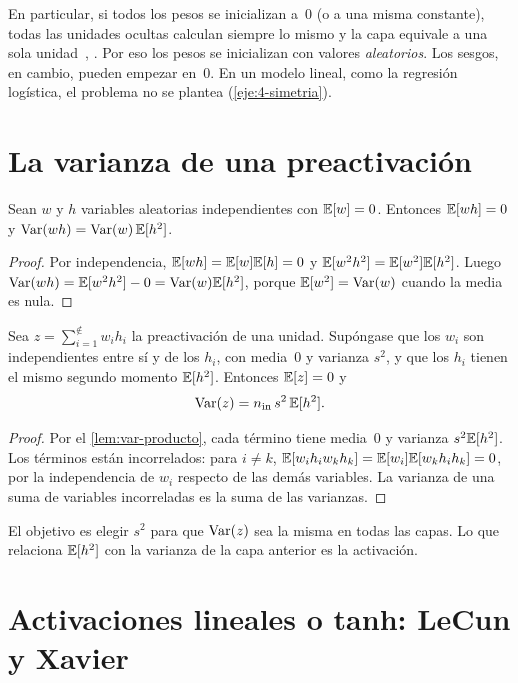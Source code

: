En particular, si todos los pesos se inicializan a~0 (o a una misma constante), todas las unidades ocultas calculan siempre lo mismo y la capa equivale a una sola unidad~\cite{cs231n}, \cite[§5.4.1.3]{d2l}. Por eso los pesos se inicializan con valores \emph{aleatorios}. Los sesgos, en cambio, pueden empezar en~0. En un modelo lineal, como la regresión logística, el problema no se plantea (\cref{eje:4-simetria}).

\section{La varianza de una preactivación}

\begin{lema}\label{lem:var-producto}
Sean $w$ y $h$ variables aleatorias independientes con $\mathbb{E}[w]=0$. Entonces $\mathbb{E}[wh]=0$ y $\operatorname{Var}(wh)=\operatorname{Var}(w)\,\mathbb{E}[h^{2}]$.
\end{lema}

\begin{proof}
Por independencia, $\mathbb{E}[wh]=\mathbb{E}[w]\mathbb{E}[h]=0$ y $\mathbb{E}[w^{2}h^{2}]=\mathbb{E}[w^{2}]\mathbb{E}[h^{2}]$. Luego $\operatorname{Var}(wh)=\mathbb{E}[w^{2}h^{2}]-0=\operatorname{Var}(w)\mathbb{E}[h^{2}]$, porque $\mathbb{E}[w^{2}]=\operatorname{Var}(w)$ cuando la media es nula.
\end{proof}

\begin{proposicion}\label{prop:var-adelante}
Sea $z=\sum_{i=1}^{\nin}w_ih_i$ la preactivación de una unidad. Supóngase que los $w_i$ son independientes entre sí y de los $h_i$, con media~0 y varianza $s^{2}$, y que los $h_i$ tienen el mismo segundo momento $\mathbb{E}[h^{2}]$. Entonces $\mathbb{E}[z]=0$ y
\[
\operatorname{Var}(z)=n_{\mathrm{in}}\,s^{2}\,\mathbb{E}[h^{2}].
\]
\end{proposicion}

\begin{proof}
Por el \cref{lem:var-producto}, cada término tiene media~0 y varianza $s^{2}\mathbb{E}[h^{2}]$. Los términos están incorrelados: para $i\neq k$, $\mathbb{E}[w_ih_iw_kh_k]=\mathbb{E}[w_i]\mathbb{E}[w_kh_ih_k]=0$, por la independencia de $w_i$ respecto de las demás variables. La varianza de una suma de variables incorreladas es la suma de las varianzas.
\end{proof}

El objetivo es elegir $s^{2}$ para que $\operatorname{Var}(z)$ sea la misma en todas las capas. Lo que relaciona $\mathbb{E}[h^{2}]$ con la varianza de la capa anterior es la activación.

\section{Activaciones lineales o tanh: LeCun y Xavier}


